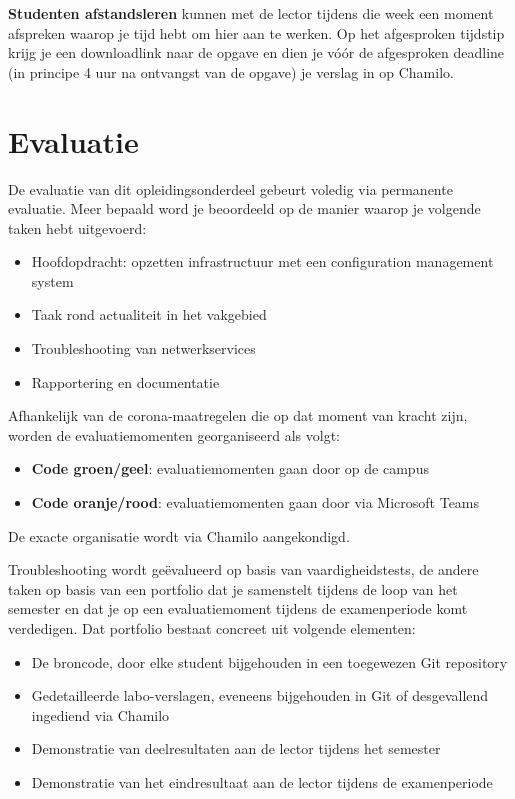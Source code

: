 \textbf{Studenten afstandsleren} kunnen met de lector tijdens die week een moment afspreken waarop je tijd hebt om hier aan te werken. Op het afgesproken tijdstip krijg je een downloadlink naar de opgave en dien je vóór de afgesproken deadline (in principe 4 uur na ontvangst van de opgave) je verslag in op Chamilo.

\section{Evaluatie}%
\label{sec:evaluatie}

De evaluatie van dit opleidingsonderdeel gebeurt voledig via permanente evaluatie. Meer bepaald word je beoordeeld op de manier waarop je volgende taken hebt uitgevoerd:

\begin{itemize}
  \item Hoofdopdracht: opzetten infrastructuur met een configuration management system
  \item Taak rond actualiteit in het vakgebied
  \item Troubleshooting van netwerkservices
  \item Rapportering en documentatie
\end{itemize}

Afhankelijk van de corona-maatregelen die op dat moment van kracht zijn, worden de evaluatiemomenten georganiseerd als volgt:

\begin{itemize}
  \item \textbf{Code groen/geel}: evaluatiemomenten gaan door op de campus
  \item \textbf{Code oranje/rood}: evaluatiemomenten gaan door via Microsoft Teams
\end{itemize}

De exacte organisatie wordt via Chamilo aangekondigd.

Troubleshooting wordt geëvalueerd op basis van vaardigheidstests, de andere taken op basis van een portfolio dat je samenstelt tijdens de loop van het semester en dat je op een evaluatiemoment tijdens de examenperiode komt verdedigen. Dat portfolio bestaat concreet uit volgende elementen:

\begin{itemize}
  \item De broncode, door elke student bijgehouden in een toegewezen Git repository
  \item Gedetailleerde labo-verslagen, eveneens bijgehouden in Git of desgevallend ingediend via Chamilo
  \item Demonstratie van deelresultaten aan de lector tijdens het semester
  \item Demonstratie van het eindresultaat aan de lector tijdens de examenperiode
\end{itemize}

